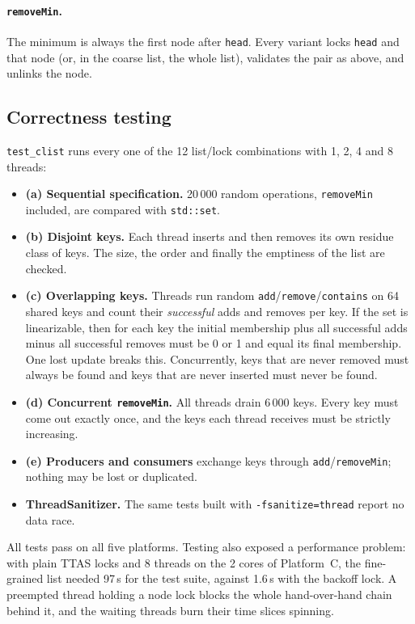 \paragraph{\texttt{removeMin}.} The minimum is always the first node after
\texttt{head}. Every variant locks \texttt{head} and that node (or, in the
coarse list, the whole list), validates the pair as above, and unlinks the node.

\subsection{Correctness testing}

\texttt{test\_clist} runs every one of the 12 list/lock combinations with 1, 2,
4 and 8 threads:

\begin{itemize}[nosep]
  \item \textbf{(a) Sequential specification.} 20\,000 random operations,
        \texttt{removeMin} included, are compared with \texttt{std::set}.
  \item \textbf{(b) Disjoint keys.} Each thread inserts and then removes its own
        residue class of keys. The size, the order and finally the emptiness
        of the list are checked.
  \item \textbf{(c) Overlapping keys.} Threads run random
        \texttt{add}/\texttt{remove}/\texttt{contains} on 64 shared keys and
        count their \emph{successful} adds and removes per key. If the set is
        linearizable, then for each key the initial membership plus all
        successful adds minus all successful removes must be 0 or 1 and equal
        its final membership. One lost update breaks this. Concurrently,
        keys that are never removed must always be found and keys that are
        never inserted must never be found.
  \item \textbf{(d) Concurrent \texttt{removeMin}.} All threads drain 6\,000
        keys. Every key must come out exactly once, and the keys each thread
        receives must be strictly increasing.
  \item \textbf{(e) Producers and consumers} exchange keys through
        \texttt{add}/\texttt{removeMin}; nothing may be lost or duplicated.
  \item \textbf{ThreadSanitizer.} The same tests built with
        \texttt{-fsanitize=thread} report no data race.
\end{itemize}

All tests pass on all five platforms. Testing also exposed a performance
problem: with plain TTAS locks and 8 threads on the 2 cores of Platform~C, the
fine-grained list needed 97\,s for the test suite, against 1.6\,s with the
backoff lock. A preempted thread holding a node lock blocks the whole
hand-over-hand chain behind it, and the waiting threads burn their time slices
spinning.

